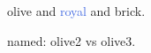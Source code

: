 \documentclass[dvipsnames]{article}
\begin{document}
\textcolor{OliveGreen}{olive} and \textcolor{RoyalBlue}{royal} and
\textcolor{BrickRed}{brick}.

named: \textcolor[named]{OliveGreen}{olive2} vs \textcolor{myolive}{olive3}.
\end{document}
